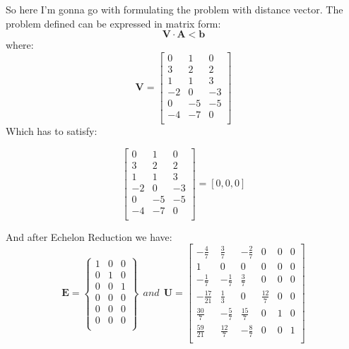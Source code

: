 \documentclass[12pt]{article}
\begin{document}
%
%
%
So here I'm gonna go with formulating the problem with distance
vector.
The problem defined can be expressed in matrix form: $$\pmb{V\cdot A < b }$$
 where:
\begin{equation}
 \pmb{V} =\begin{bmatrix}
 0 & 1  & 0  \\
 3 & 2  & 2  \\
 1 & 1 & 3 \\
-2 & 0 & -3 \\
0 & -5 & -5 \\
-4 & -7 & 0 \\

 \end{bmatrix}
\end{equation}
Which has to satisfy:

\begin{equation}
  [i_s, j_s, k_s, i_t, j_t, k_t] \begin{bmatrix}
 0 & 1  & 0  \\
 3 & 2  & 2  \\
 1 & 1 & 3 \\
-2 & 0 & -3 \\
0 & -5 & -5 \\
-4 & -7 & 0 \\

 \end{bmatrix}
= [0, 0, 0]
\end{equation}


And after Echelon Reduction we have:
\begin{equation}
  \pmb{E} = \begin{Bmatrix}
    1 & 0 & 0 \\
0 & 1 & 0 \\
0 & 0 & 1 \\
0 & 0 & 0 \\
0 & 0 & 0 \\
0 & 0 & 0 \\
  \end{Bmatrix}
~~and~~ \pmb{U}
=
\begin{bmatrix}
  -\frac{4}{7} & \frac{3}{7} & -\frac{2}{7}  & 0 & 0  & 0 \\
 1 & 0 &  0 & 0 &  0 & 0 \\
 -\frac{1}{7} & -\frac{1}{7} & \frac{3}{7} & 0 & 0 & 0 \\
-\frac{17}{21}& \frac{1}{3} & 0 & \frac{12}{7}  & 0 & 0 \\
\frac{30}{7} & -\frac{5}{7} & \frac{15}{7} & 0 & 1 & 0 \\
\frac{59}{21}& \frac{12}{7} & -\frac{8}{7} & 0 & 0 & 1 \\
\end{bmatrix}
\end{equation}
\end{document}
